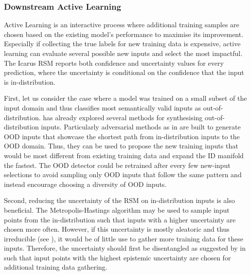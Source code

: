 \subsubsection{Downstream Active Learning}

Active Learning is an interactive process where additional training samples are chosen based on the existing model's performance to maximise its improvement. Especially if collecting the true labels for new training data is expensive, active learning can evaluate several possible new inputs and select the most impactful. The Icarus RSM reports both confidence and uncertainty values for every prediction, where the uncertainty is conditional on the confidence that the input is in-distribution. 

First, let us consider the case where a model was trained on a small subset of the input domain and thus classifies most semantically valid inputs as out-of-distribution.  has already explored several methods for synthesising out-of-distribution inputs. Particularly adversarial methods as in  are built to generate OOD inputs that showcase the shortest path from in-distribution inputs to the OOD domain. Thus, they can be used to propose the new training inputs that would be most different from existing training data and expand the ID manifold the fastest. The OOD detector could be retrained after every few new-input selections to avoid sampling only OOD inputs that follow the same pattern and instead encourage choosing a diversity of OOD inputs.

Second, reducing the uncertainty of the RSM on in-distribution inputs is also beneficial. The Metropolis-Hastings algorithm \cite{metropolis-algorithm-1953, metropolis-hastings-1970} may be used to sample input points from the in-distribution such that inputs with a higher uncertainty are chosen more often. However, if this uncertainty is mostly aleatoric and thus irreducible (see ), it would be of little use to gather more training data for these inputs. Therefore, the uncertainty should first be disentangled as suggested by \textcite{uncertainty-disentanglement-2022} in  such that input points with the highest epistemic uncertainty are chosen for additional training data gathering.
